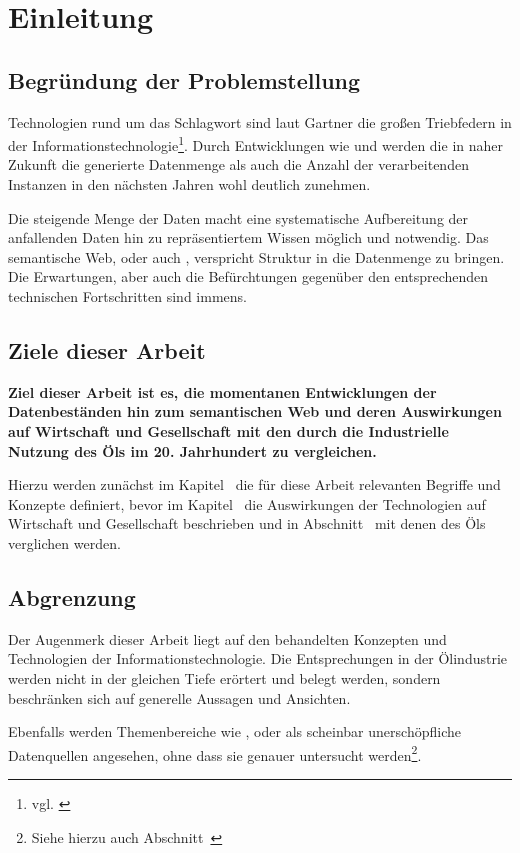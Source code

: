 \section{Einleitung}
\label{sec:einleitung}

\subsection{Begründung der Problemstellung}

Technologien rund um das Schlagwort  sind laut Gartner die großen Triebfedern in der Informationstechnologie\footnote{vgl. \cite{gartner2014}}. Durch Entwicklungen wie  und  werden die in naher Zukunft die generierte Datenmenge als auch die Anzahl der verarbeitenden Instanzen in den nächsten Jahren wohl deutlich zunehmen.

Die steigende Menge der Daten macht eine systematische Aufbereitung der anfallenden Daten hin zu repräsentiertem Wissen möglich und notwendig. Das semantische Web, oder auch , verspricht Struktur in die Datenmenge zu bringen. Die Erwartungen, aber auch die Befürchtungen gegenüber den entsprechenden technischen Fortschritten sind immens.

\subsection{Ziele dieser Arbeit}

\textbf{Ziel dieser Arbeit ist es, die momentanen Entwicklungen der Datenbeständen hin zum semantischen Web und deren Auswirkungen auf Wirtschaft und Gesellschaft mit den durch die Industrielle Nutzung des Öls im 20. Jahrhundert zu vergleichen.}

Hierzu werden zunächst im Kapitel~ die für diese Arbeit relevanten Begriffe und Konzepte definiert, bevor im Kapitel~ die Auswirkungen der Technologien auf Wirtschaft und Gesellschaft beschrieben und in Abschnitt~ mit denen des Öls verglichen werden.

\subsection{Abgrenzung}

Der Augenmerk dieser Arbeit liegt auf den behandelten Konzepten und Technologien der Informationstechnologie. Die Entsprechungen in der Ölindustrie werden nicht in der gleichen Tiefe erörtert und belegt werden, sondern beschränken sich auf generelle Aussagen und Ansichten.

Ebenfalls werden Themenbereiche wie ,  oder  als scheinbar unerschöpfliche Datenquellen angesehen, ohne dass sie genauer untersucht werden\footnote{Siehe hierzu auch Abschnitt~}.